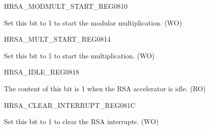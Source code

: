 \begin{register}{H}{RSA\_MODMULT\_START\_REG}{\hexprefix{}0810}\label{regdesc:RSAMODMULTSTARTREG}
%
%
\regnewline%
\begin{regdesc}\begin{reglist}
\item [RSA\_MODMULT\_START] Set this bit to 1 to start the modular multiplication. (WO)
\end{reglist}\end{regdesc}
\end{register}


\begin{register}{H}{RSA\_MULT\_START\_REG}{\hexprefix{}0814}\label{regdesc:RSAMULTSTARTREG}
%
%
\regnewline%
\begin{regdesc}\begin{reglist}
\item [RSA\_MULT\_START] Set this bit to 1 to start the multiplication. (WO)
\end{reglist}\end{regdesc}
\end{register}



\begin{register}{H}{RSA\_IDLE\_REG}{\hexprefix{}0818}\label{regdesc:RSAIDLEREG}
%
%
\regnewline%
\begin{regdesc}\begin{reglist}
\item [RSA\_IDLE] The content of this bit is 1 when the RSA accelerator is idle. (RO)
\end{reglist}\end{regdesc}
\end{register}


\begin{register}{H}{RSA\_CLEAR\_INTERRUPT\_REG}{\hexprefix{}081C}\label{regdesc:RSACLEARINTERRUPTREG}
%
%
\regnewline%
\begin{regdesc}\begin{reglist}
\item [RSA\_CLEAR\_INTERRUPT] Set this bit to 1 to clear the RSA interrupts. (WO)
\end{reglist}\end{regdesc}
\end{register}


